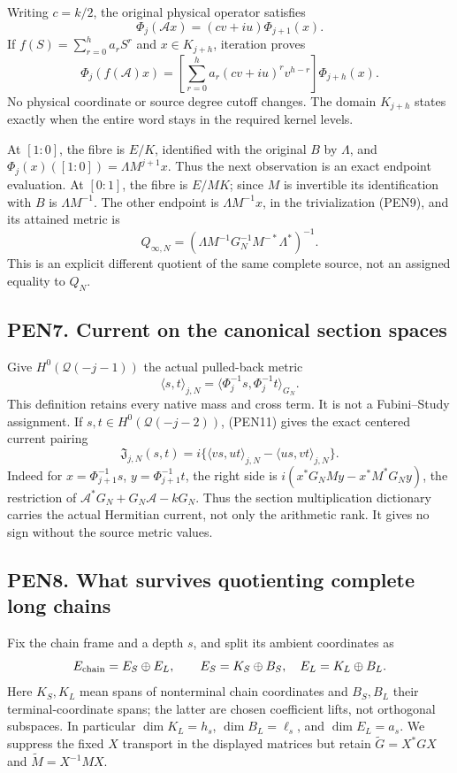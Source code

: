 \documentclass[11pt]{article}
\begin{document}
Writing \(c=k/2\), the original physical operator satisfies \[
\Phi_j(\mathscr A x)=(cv+iu)\Phi_{j+1}(x). \tag{PEN12}
\] If \(f(S)=\sum_{r=0}^ha_rS^r\) and \(x\in K_{j+h}\), iteration proves \[
\Phi_j(f(\mathscr A)x)
=\left[\sum_{r=0}^ha_r(cv+iu)^r v^{h-r}\right]\Phi_{j+h}(x). \tag{PEN13}
\] No physical coordinate or source degree cutoff changes. The domain \(K_{j+h}\) states exactly when the entire word stays in the required kernel levels.

At \([1:0]\), the fibre is \(E/K\), identified with the original \(B\) by \(\Lambda\), and \(\Phi_j(x)([1:0])=\Lambda M^{j+1}x\). Thus the next observation is an exact endpoint evaluation. At \([0:1]\), the fibre is \(E/MK\); since \(M\) is invertible its identification with \(B\) is \(\Lambda M^{-1}\). The other endpoint is \(\Lambda M^{-1}x\), in the trivialization (PEN9), and its attained metric is \[
Q_{\infty,N}=(\Lambda M^{-1}G_N^{-1}M^{-*}\Lambda^*)^{-1}.
\] This is an explicit different quotient of the same complete source, not an assigned equality to \(Q_N\).

\subsection{PEN7. Current on the canonical section spaces}\label{pen7.-current-on-the-canonical-section-spaces}

Give \(H^0(\mathcal Q(-j-1))\) the actual pulled-back metric \[
\langle s,t\rangle_{j,N}
=\langle\Phi_j^{-1}s,\Phi_j^{-1}t\rangle_{G_N}.
\] This definition retains every native mass and cross term. It is not a Fubini--Study assignment. If \(s,t\in H^0(\mathcal Q(-j-2))\), (PEN11) gives the exact centered current pairing \[
\mathfrak J_{j,N}(s,t)
=i\{\langle vs,ut\rangle_{j,N}
-\langle us,vt\rangle_{j,N}\}. \tag{PEN14}
\] Indeed for \(x=\Phi_{j+1}^{-1}s\), \(y=\Phi_{j+1}^{-1}t\), the right side is \(i(x^*G_NMy-x^*M^*G_Ny)\), the restriction of \(\mathscr A^*G_N+G_N\mathscr A-kG_N\). Thus the section multiplication dictionary carries the actual Hermitian current, not only the arithmetic rank. It gives no sign without the source metric values.

\subsection{PEN8. What survives quotienting complete long chains}\label{pen8.-what-survives-quotienting-complete-long-chains}

Fix the chain frame and a depth \(s\), and split its ambient coordinates as \[
E_{\rm chain}=E_S\oplus E_L,\qquad
E_S=K_S\oplus B_S,\quad E_L=K_L\oplus B_L.
\] Here \(K_S,K_L\) mean spans of nonterminal chain coordinates and \(B_S,B_L\) their terminal-coordinate spans; the latter are chosen coefficient lifts, not orthogonal subspaces. In particular \(\dim K_L=h_s\), \(\dim B_L=\ell_s\), and \(\dim E_L=a_s\). We suppress the fixed \(X\) transport in the displayed matrices but retain \(\widetilde G=X^*GX\) and \(\widetilde M=X^{-1}MX\).
\end{document}
